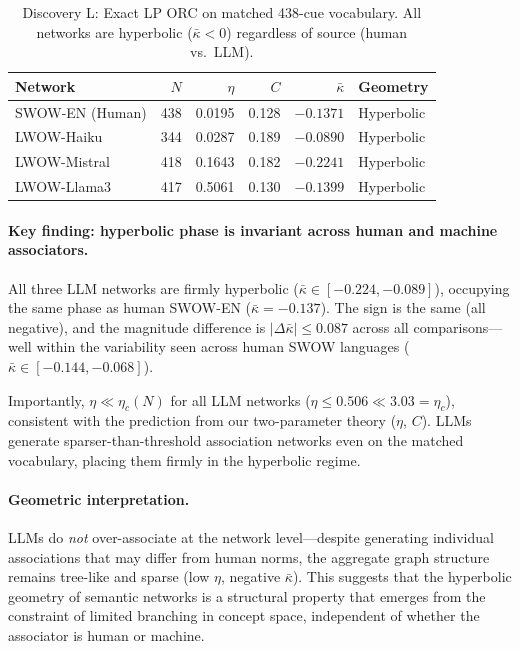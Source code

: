 \documentclass[11pt,a4paper]{article}
\begin{document}
\begin{table}[h]
\centering
\caption{Discovery L: Exact LP ORC on matched 438-cue vocabulary. All networks are
hyperbolic ($\bar{\kappa}<0$) regardless of source (human vs.\ LLM).}
\label{tab:discovery_l}
\begin{tabular}{lrrrrl}
\hline
Network & $N$ & $\eta$ & $C$ & $\bar{\kappa}$ & Geometry \\
\hline
SWOW-EN (Human) & 438 & 0.0195 & 0.128 & $-0.1371$ & Hyperbolic \\
LWOW-Haiku & 344 & 0.0287 & 0.189 & $-0.0890$ & Hyperbolic \\
LWOW-Mistral & 418 & 0.1643 & 0.182 & $-0.2241$ & Hyperbolic \\
LWOW-Llama3 & 417 & 0.5061 & 0.130 & $-0.1399$ & Hyperbolic \\
\hline
\end{tabular}
\end{table}

\paragraph{Key finding: hyperbolic phase is invariant across human and machine associators.}
All three LLM networks are firmly hyperbolic ($\bar{\kappa} \in [-0.224, -0.089]$),
occupying the same phase as human SWOW-EN ($\bar{\kappa}=-0.137$).
The sign is the same (all negative), and the magnitude difference is
$|\Delta\bar{\kappa}| \leq 0.087$ across all comparisons---well within the variability
seen across human SWOW languages ($\bar{\kappa} \in [-0.144, -0.068]$).

Importantly, $\eta \ll \eta_c(N)$ for all LLM networks ($\eta \leq 0.506 \ll 3.03 = \eta_c$),
consistent with the prediction from our two-parameter theory ($\eta$, $C$).
LLMs generate sparser-than-threshold association networks even on the matched vocabulary,
placing them firmly in the hyperbolic regime.

\paragraph{Geometric interpretation.}
LLMs do \emph{not} over-associate at the network level---despite generating
individual associations that may differ from human norms, the aggregate graph
structure remains tree-like and sparse (low $\eta$, negative $\bar{\kappa}$).
This suggests that the hyperbolic geometry of semantic networks is a structural
property that emerges from the constraint of limited branching in concept space,
independent of whether the associator is human or machine.
\end{document}
